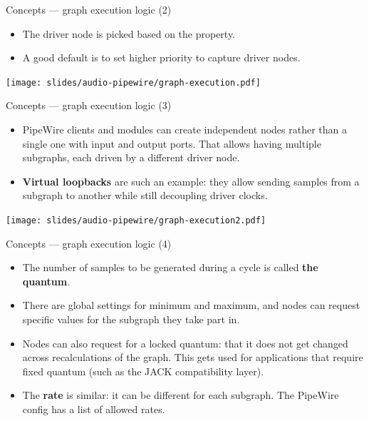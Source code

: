 \begin{frame}{Concepts — graph execution logic (2)}
  \begin{itemize}
  \item The driver node is picked based on the  property.
  \item A good default is to set higher priority to capture driver nodes.
  \end{itemize}

  \begin{center}
    \texttt{[image: slides/audio-pipewire/graph-execution.pdf]}\\
  \end{center}
\end{frame}



\begin{frame}{Concepts — graph execution logic (3)}
  \begin{itemize}

  \item PipeWire clients and modules can create independent nodes
    rather than a single one with input and output ports. That allows
    having multiple subgraphs, each driven by a different driver node.

  \item \textbf{Virtual loopbacks} are such an example: they allow
    sending samples from a subgraph to another while still decoupling
    driver clocks.

  \end{itemize}

  \begin{center}
    \texttt{[image: slides/audio-pipewire/graph-execution2.pdf]}\\
  \end{center}
\end{frame}



\begin{frame}{Concepts — graph execution logic (4)}
  \begin{itemize}

  \item The number of samples to be generated during a cycle is called
    \textbf{the quantum}.

  \item There are global settings for minimum and
    maximum, and nodes can request specific values for the subgraph
    they take part in.

  \item Nodes can also request for a locked quantum: that it does not
    get changed across recalculations of the graph. This gets used for
    applications that require fixed quantum (such as the JACK
    compatibility layer).

  \item The \textbf{rate} is similar: it can be different for each
    subgraph. The PipeWire config has a list of allowed rates.

  \end{itemize}
\end{frame}



